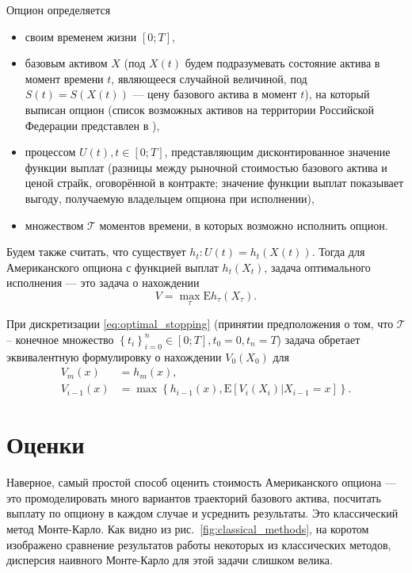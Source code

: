 \documentclass[specialist,
               substylefile = ../spbu.rtx,
               subf,href,colorlinks=true, 12pt]{disser}
\newcommand{\E}{\mathrm{E}}
\newcommand{\Tau}{\ensuremath{\mathcal{T}}}
\begin{document}
Опцион определяется 
\begin{itemize}[noitemsep,topsep=0pt]
\item своим временем жизни $[0;T]$, 
\item базовым активом $X$ (под $X(t)$ будем подразумевать состояние актива в момент времени $t$, являющееся случайной величиной, под $S(t) = S(X(t))$ --- цену базового актива в момент $t$), на который выписан опцион (список возможных активов на территории Российской Федерации представлен в \cite{fsfr}), 
\item процессом $U(t), t\in [0;T]$, представляющим дисконтированное значение функции выплат (разницы между рыночной стоимостью базового актива и ценой страйк, оговорённой в контракте; значение функции выплат показывает выгоду, получаемую владельцем опциона при исполнении),
\item множеством $\Tau$ моментов времени, в которых возможно исполнить опцион.
\end{itemize} 
Будем также считать, что существует $h_t: U(t) = h_t\left(X(t)\right)$. Тогда для Американского опциона с функцией выплат $h_t\left(X_t\right)$, задача оптимального исполнения --- это задача о нахождении 
\begin{equation}\label{eq:optimal_stopping}
V = \max_{\tau} \E h_\tau\left(X_\tau\right).
\end{equation}

При дискретизации \eqref{eq:optimal_stopping} (принятии предположения о том, что $\Tau$ -- конечное множество $\left\lbrace t_i\right\rbrace_{i=0}^n \in \left[0;T\right], t_0 = 0, t_n = T$) задача обретает эквивалентную формулировку о нахождении $V_0\left(X_0\right)$ для
\begin{equation}\label{eq:option-recursive}\begin{aligned}
			V_m\left(x\right) &= h_m\left(x\right), \\
			V_{i-1}\left(x\right) &= \max\left\lbrace h_{i-1}\left(x\right), \E\left[V_i\left(X_i\right)|X_{i-1}=x\right]\right\rbrace.
\end{aligned}\end{equation}


\section{Оценки} %
\label{sec:estimators}

Наверное, самый простой способ оценить стоимость Американского опциона --- это промоделировать много вариантов траекторий базового актива, посчитать выплату по опциону в каждом случае и усреднить результаты. Это классический метод Монте-Карло. Как видно из рис.~\ref{fig:classical_methods}, на коротом изображено сравнение результатов работы некоторых из классических методов, дисперсия наивного Монте-Карло для этой задачи слишком велика.
\end{document}
